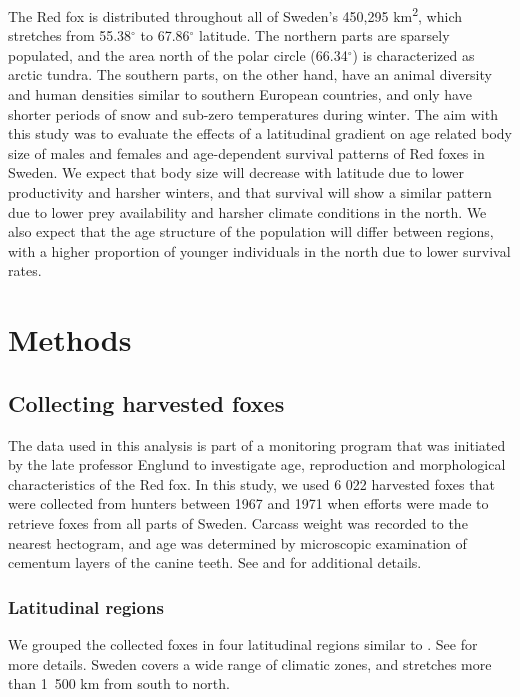 \documentclass[12pt,a4paper,final,abstract=true,headings=small]{scrartcl}
\begin{document}
The Red fox is distributed throughout all of Sweden's 450,295 km\textsuperscript{2}, which stretches from 55.38$^{\circ}$ to 67.86$^{\circ}$ latitude.  The northern parts are sparsely populated, and the area north of the polar circle (66.34$^{\circ}$) is characterized as arctic tundra. The southern parts, on the other hand, have an animal  diversity and human densities similar to southern European countries, and only have shorter periods of snow and sub-zero temperatures during winter. The aim with this study was to evaluate the effects of a latitudinal gradient on age related body size of males and females and age-dependent survival patterns of Red foxes in Sweden. We expect that body size will decrease with latitude due to lower productivity and harsher winters, and that survival will show a similar pattern due to lower prey availability and harsher climate conditions in the north. We also expect that the age structure of the population will differ between regions, with a higher proportion of younger individuals in the north due to lower survival rates.

\section*{Methods}

\subsection*{Collecting harvested foxes}

The data used in this analysis is part of a monitoring program that was initiated by the late professor Englund to investigate age, reproduction and morphological characteristics of the Red fox. In this study, we used 6 022 harvested foxes that were collected from hunters between 1967 and 1971 when efforts were made to retrieve foxes from all parts of Sweden. Carcass weight was recorded to the nearest hectogram, and age was determined by microscopic examination of cementum layers of the canine teeth.  See \citet{englundStudiesFoodEcology1965} and \citet{englundAspectsReproductionMortality1970} for additional details.

\subsubsection*{Latitudinal regions}

We grouped the collected foxes in four latitudinal regions similar to \cite{englundAspectsReproductionMortality1970}.  See \citep{zhengEstimatingNetPrimary2004, GeographySweden2025,MarkanvandningenSverigeLand2013} for more details. Sweden covers a wide range of climatic zones, and stretches more than 1~500 km from south to north.
\end{document}
